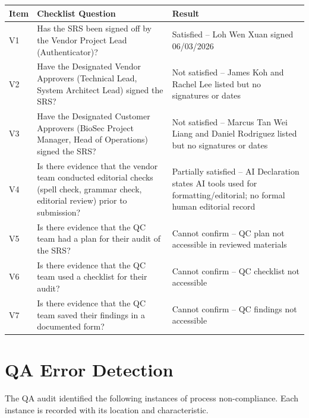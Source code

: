 \documentclass[11pt,a4paper]{article}
\begin{document}
\begin{longtable}{|p{}|p{}|p{}|}
\hline
\rowcolor{tableheader}
\textbf{Item} & \textbf{Checklist Question} & \textbf{Result} \\
\hline
\endhead

V1 & Has the SRS been signed off by the Vendor Project Lead (Authenticator)? & Satisfied -- Loh Wen Xuan signed 06/03/2026 \\
\hline
V2 & Have the Designated Vendor Approvers (Technical Lead, System Architect Lead) signed the SRS? & Not satisfied -- James Koh and Rachel Lee listed but no signatures or dates \\
\hline
V3 & Have the Designated Customer Approvers (BioSec Project Manager, Head of Operations) signed the SRS? & Not satisfied -- Marcus Tan Wei Liang and Daniel Rodriguez listed but no signatures or dates \\
\hline
V4 & Is there evidence that the vendor team conducted editorial checks (spell check, grammar check, editorial review) prior to submission? & Partially satisfied -- AI Declaration states AI tools used for formatting/editorial; no formal human editorial record \\
\hline
V5 & Is there evidence that the QC team had a plan for their audit of the SRS? & Cannot confirm -- QC plan not accessible in reviewed materials \\
\hline
V6 & Is there evidence that the QC team used a checklist for their audit? & Cannot confirm -- QC checklist not accessible \\
\hline
V7 & Is there evidence that the QC team saved their findings in a documented form? & Cannot confirm -- QC findings not accessible \\
\hline
\end{longtable}


\section{QA Error Detection}

The QA audit identified the following instances of process non-compliance. Each instance is recorded with its location and characteristic.
\end{document}
